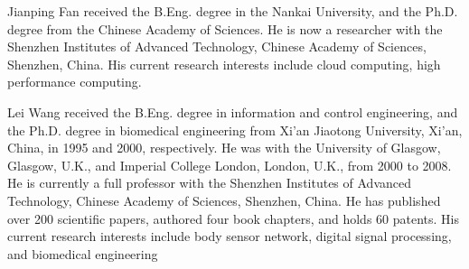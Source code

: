 \documentclass[journal]{IEEEtran}
\begin{document}
\begin{IEEEbiography}{Jianping Fan}
received the B.Eng. degree in the Nankai University, and the Ph.D. degree from the Chinese Academy of Sciences. He is now a researcher with the Shenzhen Institutes of Advanced Technology, Chinese Academy of Sciences, Shenzhen, China. His current research interests include cloud computing, high performance computing.
\end{IEEEbiography}
\begin{IEEEbiography}{Lei Wang}
received the B.Eng. degree in information and control engineering, and the Ph.D. degree in biomedical engineering from Xi’an Jiaotong University, Xi’an, China, in 1995 and 2000, respectively. He was with the University of Glasgow, Glasgow, U.K., and Imperial College London, London, U.K., from 2000 to 2008. He is currently a full professor with the Shenzhen Institutes of Advanced Technology, Chinese Academy of Sciences, Shenzhen, China. He has published over 200 scientific papers, authored four book chapters, and holds 60 patents. His current research interests include body sensor network, digital signal processing, and biomedical engineering
\end{IEEEbiography}







\end{document}

